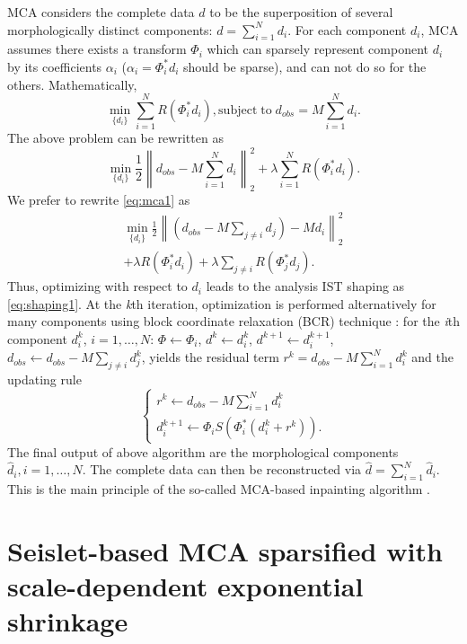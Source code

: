 MCA considers the complete data $d$ to be the superposition of several morphologically distinct components: $d=\sum_{i=1}^Nd_i$. For each component $d_i$, MCA assumes there exists a transform $\Phi_i$ which can sparsely represent component $d_i$ by its coefficients $\alpha_i$ ($\alpha_i=\Phi_i^{*}d_i$ should be sparse), and can not do so for the others. Mathematically,
\begin{equation}\label{eq:mca_un}
  \min_{\{d_i\}}\sum_{i=1}^{N}R(\Phi_i^{*}d_i), \mathrm{subject\; to}\;  d_{obs}=M\sum_{i=1}^{N}d_i.
\end{equation}
The above problem can be rewritten as
\begin{equation}\label{eq:mca1}
  \min_{\{d_i\}}\frac{1}{2}\left\|d_{obs}-M\sum_{i=1}^Nd_i\right\|_2^2+\lambda \sum_{i=1}^NR(\Phi_i^{*}d_i).
\end{equation}
We prefer to rewrite \eqref{eq:mca1} as
\begin{eqnarray}
  \min_{\{d_i\}}\frac{1}{2}\left\|\left(d_{obs}-M\sum_{j\neq i}d_j\right)-Md_i\right\|_2^2 \nonumber\\
   +\lambda R(\Phi_i^{*}d_i)+\lambda \sum_{j\neq i}R(\Phi_j^{*}d_j).
\end{eqnarray}
Thus, optimizing with respect to $d_i$ leads to the analysis IST shaping as \eqref{eq:shaping1}. At the \emph{k}th iteration, optimization is performed alternatively for many components using block coordinate relaxation (BCR) technique \citep{bruce1998block}: for the \emph{i}th component $d_i^{k}$, $i=1,\ldots,N$: $\Phi\leftarrow \Phi_i$, $d^{k}\leftarrow d_i^{k}$, $d^{k+1}\leftarrow d_i^{k+1}$, $d_{obs}\leftarrow d_{obs}-M\sum_{j\neq i}d_j^{k}$, yields the residual term $r^{k}=d_{obs}-M\sum_{i=1}^N d_i^{k}$ and the updating rule
\begin{equation}\label{eq:mca2}
  \left\{
  \begin{array}{l}
    r^{k}\leftarrow d_{obs}-M\sum_{i=1}^N d_i^{k}  \\
    d_i^{k+1}\leftarrow \Phi_i S(\Phi_i^{*}(d_i^{k}+r^{k})).
  \end{array}
  \right.
\end{equation}
The final output of above algorithm are the morphological components $\hat{d}_i,i=1,\ldots,N$. The complete data can then be reconstructed via $\hat{d}=\sum_{i=1}^N \hat{d}_i$.
This is the main principle of the so-called MCA-based inpainting algorithm \citep{Elad2005}.


\section{Seislet-based MCA sparsified with scale-dependent exponential shrinkage}

